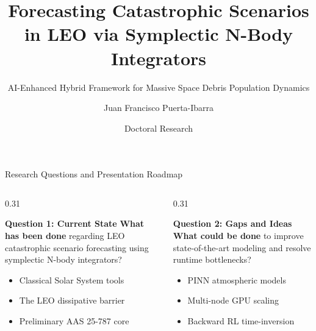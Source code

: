 \documentclass[aspectratio=169,10pt]{beamer}
\title[PhD Research Proposal]{Forecasting Catastrophic Scenarios in LEO via Symplectic N-Body Integrators}
\subtitle{AI-Enhanced Hybrid Framework for Massive Space Debris Population Dynamics}
\author[J. F. Puerta-Ibarra (Aerospace Engineering)]{Juan Francisco Puerta-Ibarra}
\institute[Aerospace Engineering]{Faculty of Engineering \\ Universidad de Antioquia}
\date[Doctoral Defense]{Doctoral Research}
\begin{document}
\begin{frame}[plain]
    \titlepage
\end{frame}

\begin{frame}{Research Questions and Presentation Roadmap}
    \begin{columns}[t]
        \begin{column}{0.31\textwidth}
            \begin{block}{\textbf{Question 1: Current State}}
                \small
                \textbf{What has been done} regarding LEO catastrophic scenario forecasting using symplectic N-body integrators?
                \begin{itemize}
                    \setlength{\itemsep}{2pt}
                    \item Classical Solar System tools
                    \item The LEO dissipative barrier
                    \item Preliminary AAS 25-787 core
                \end{itemize}
            \end{block}
        \end{column}
        
        \begin{column}{0.31\textwidth}
            \begin{exampleblock}{\textbf{Question 2: Gaps and Ideas}}
                \small
                \textbf{What could be done} to improve state-of-the-art modeling and resolve runtime bottlenecks?
                \begin{itemize}
                    \setlength{\itemsep}{2pt}
                    \item PINN atmospheric models
                    \item Multi-node GPU scaling
                    \item Backward RL time-inversion
                \end{itemize}
            \end{exampleblock}
        \end{column}
        

\end{columns}
\end{frame}
\end{document}
